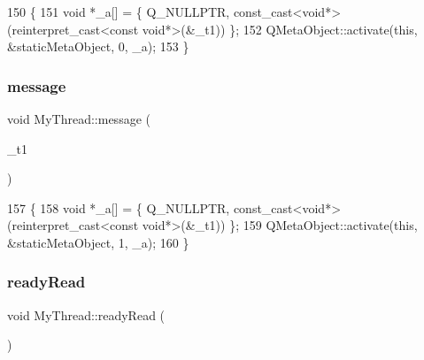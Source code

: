 \begin{DoxyCode}
150 \{
151     \textcolor{keywordtype}{void} *\_a[] = \{ Q\_NULLPTR, \textcolor{keyword}{const\_cast<}\textcolor{keywordtype}{void}*\textcolor{keyword}{>}(\textcolor{keyword}{reinterpret\_cast<}\textcolor{keyword}{const }\textcolor{keywordtype}{void}*\textcolor{keyword}{>}(&\_t1)) \};
152     QMetaObject::activate(\textcolor{keyword}{this}, &staticMetaObject, 0, \_a);
153 \}
\end{DoxyCode}
\mbox{\label{class_my_thread_ae49528d4ec1b2208240f707f5aa74adf}} 
\subsubsection{\texorpdfstring{message}{message}}
{\footnotesize\ttfamily void My\+Thread\+::message (\begin{DoxyParamCaption}\item[{Q\+String}]{\+\_\+t1 }\end{DoxyParamCaption})\hspace{0.3cm}{\ttfamily [signal]}}


\begin{DoxyCode}
157 \{
158     \textcolor{keywordtype}{void} *\_a[] = \{ Q\_NULLPTR, \textcolor{keyword}{const\_cast<}\textcolor{keywordtype}{void}*\textcolor{keyword}{>}(\textcolor{keyword}{reinterpret\_cast<}\textcolor{keyword}{const }\textcolor{keywordtype}{void}*\textcolor{keyword}{>}(&\_t1)) \};
159     QMetaObject::activate(\textcolor{keyword}{this}, &staticMetaObject, 1, \_a);
160 \}
\end{DoxyCode}
\mbox{\label{class_my_thread_a277618fdd448b927f2e250c2076fc176}} 
\subsubsection{\texorpdfstring{ready\+Read}{readyRead}}
{\footnotesize\ttfamily void My\+Thread\+::ready\+Read (\begin{DoxyParamCaption}{ }\end{DoxyParamCaption})\hspace{0.3cm}{\ttfamily [slot]}}


